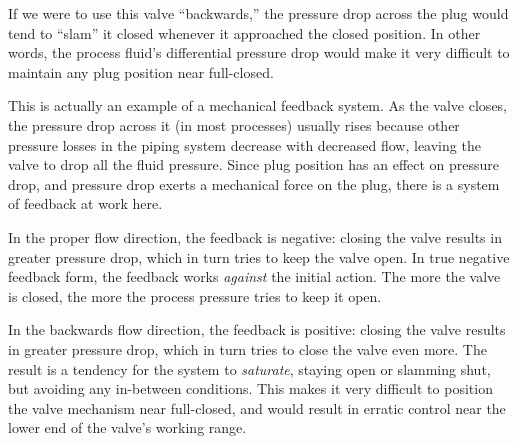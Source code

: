If we were to use this valve ``backwards,'' the pressure drop across the plug would tend to ``slam'' it closed whenever it approached the closed position.  In other words, the process fluid's differential pressure drop would make it very difficult to maintain any plug position near full-closed.

This is actually an example of a mechanical feedback system.  As the valve closes, the pressure drop across it (in most processes) usually rises because other pressure losses in the piping system decrease with decreased flow, leaving the valve to drop all the fluid pressure.  Since plug position has an effect on pressure drop, and pressure drop exerts a mechanical force on the plug, there is a system of feedback at work here.

In the proper flow direction, the feedback is negative: closing the valve results in greater pressure drop, which in turn tries to keep the valve open.  In true negative feedback form, the feedback works {\it against} the initial action.  The more the valve is closed, the more the process pressure tries to keep it open.

In the backwards flow direction, the feedback is positive: closing the valve results in greater pressure drop, which in turn tries to close the valve even more.  The result is a tendency for the system to {\it saturate}, staying open or slamming shut, but avoiding any in-between conditions.  This makes it very difficult to position the valve mechanism near full-closed, and would result in erratic control near the lower end of the valve's working range.












